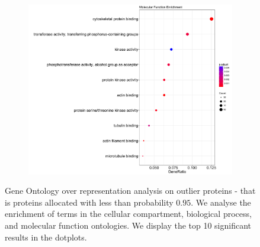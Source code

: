 \documentclass[12pt,english]{article}\usepackage[]{graphicx}\usepackage[]{color}
\begin{document}
\begin{figure}[h]
\begin{subfigure}[t]{0.5\textwidth}
\centering
\includegraphics[width=\textwidth]{MFenrich.pdf}
        \caption{}
\end{subfigure}
\caption{Gene Ontology over representation analysis on outlier
  proteins - that is proteins allocated with less than probability
  $0.95$. We analyse the enrichment of terms in the cellular
  compartment, biological process, and molecular function
  ontologies. We display the top 10 significant results in the
  dotplots.}
\label{fig:GOenrich}
\end{figure}




\clearpage



\end{document}

